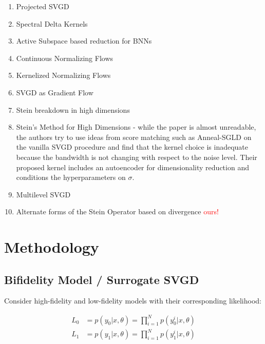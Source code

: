 \documentclass[12pt]{article}
\renewcommand{\[}{\left[}
\renewcommand{\]}{\right]}
\renewcommand{\(}{\left(}
\renewcommand{\)}{\right)}
\begin{document}
\begin{enumerate}
    \item Projected SVGD \cite{chen_projected_2020}

    \item Spectral Delta Kernels \cite{lazaro-gredilla_sparse_2010}

    \item Active Subspace based reduction for BNNs \cite{jantre_learning_2023}

    \item Continuous Normalizing Flows \cite{grathwohl_ffjord_2018}

    \item Kernelized Normalizing Flows \cite{english_kernelised_2024}

    \item SVGD as Gradient Flow \cite{liu_stein_2017}

    \item Stein breakdown in high dimensions \cite{ba_towards_2019}

    \item Stein's Method for High Dimensions \cite{chang_kernel_2020} - while the paper is almost unreadable, the authors try to use ideas from score matching such as Anneal-SGLD on the vanilla SVGD procedure and find that the kernel choice is inadequate because the bandwidth is not changing with respect to the noise level. Their proposed kernel includes an autoencoder for dimensionality reduction and conditions the hyperparameters on $\sigma$.

    \item Multilevel SVGD \cite{alsup_multilevel_2022}


    \item Alternate forms of the Stein Operator based on divergence \textcolor{red}{ours!}
\end{enumerate}

\section{Methodology}

\subsection{Bifidelity Model / Surrogate SVGD}

Consider high-fidelity and low-fidelity models with their corresponding likelihood:

\begin{align}
 L_0 &= p(y_0 | x, \theta) = \prod_{i=1}^{N} p(y_0^i | x, \theta) \\
 L_1 &= p(y_1 | x, \theta) = \prod_{i=1}^{N} p(y_1^i | x, \theta)
\end{align}
\end{document}
